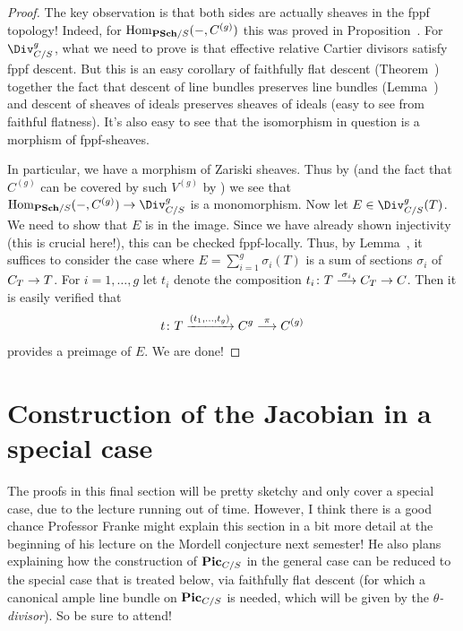 \documentclass[a4paper,parskip=half,numbers=enddot, DIV=12]{scrreprt}
\begin{document}
\begin{proof}
	The key observation is that both sides are actually sheaves in the fppf topology! Indeed, for $\Hom_{\cat{PSch}/S}(-,C^{(g)})$ this was proved in Proposition~. For $\Div_{C/S}^g$, what we need to prove is that  effective relative Cartier divisors satisfy fppf descent. But this is an easy corollary of faithfully flat descent (Theorem~) together the fact that descent of line bundles preserves line bundles (Lemma~) and descent of sheaves of ideals preserves sheaves of ideals (easy to see from faithful flatness). It's also easy to see that the isomorphism in question is a morphism of fppf-sheaves.
	
	In particular, we have a morphism of Zariski sheaves. Thus by  (and the fact that $C^{(g)}$ can be covered by such $V^{(g)}$ by ) we see that $\Hom_{\cat{PSch}/S}(-,C^{(g)})\morphism\Div_{C/S}^g$ is a monomorphism. Now let $E\in \Div_{C/S}^g(T)$. We need to show that $E$ is in the image. Since we have already shown injectivity (this is crucial here!), this can be checked fppf-locally. Thus, by Lemma~, it suffices to consider the case where $E=\sum_{i=1}^g\sigma_i(T)$ is a sum of sections $\sigma_i$ of $C_T\morphism T$. For $i=1,\ldots,g$ let $t_i$ denote the composition $t_i\colon T\morphism[\sigma_i]C_T\morphism C$. Then it is easily verified that
	\begin{align*}
		t\colon T\xrightarrow{(t_1,\ldots,t_g)} C^g\morphism[\pi]C^{(g)}
	\end{align*}
	provides a preimage of $E$. We are done!
\end{proof}

\section{Construction of the Jacobian in a special case}
The proofs in this final section will be pretty sketchy and only cover a special case, due to the lecture running out of time. However, I think there is a good chance Professor Franke might explain this section in a bit more detail at the beginning of his lecture on the Mordell conjecture next semester! He also plans explaining how the construction of $\mathbf{Pic}_{C/S}$ in the general case can be reduced to the special case that is treated below, via faithfully flat descent (for which a canonical ample line bundle on $\mathbf{Pic}_{C/S}$ is needed, which will be given by the \emph{$\theta$-divisor}). So be sure to attend!
\end{document}
